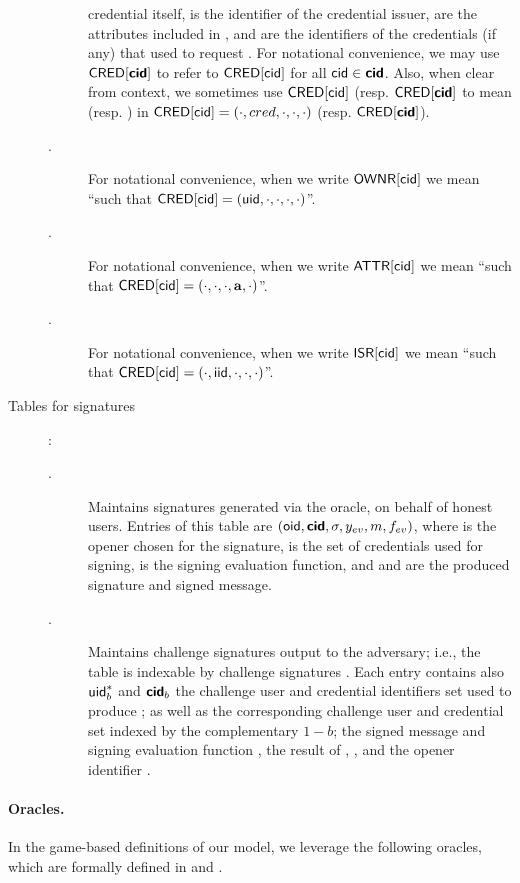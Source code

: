 \begin{description}
\begin{description}
    credential itself, \iid is the identifier of the credential issuer, \attrs
    are the attributes included in \cred, and \scid are the identifiers of the
    credentials (if any) that \uid used to request \cred. For notational
    convenience, we may use $\mathsf{CRED}[\boldsymbol{\mathsf{cid}}]$ to refer to $\mathsf{CRED}[\mathsf{cid}]$ for all
    $\mathsf{cid} \in \boldsymbol{\mathsf{cid}}$. Also, when clear from context, we sometimes use
    $\mathsf{CRED}[\mathsf{cid}]$ (resp. $\mathsf{CRED}[\boldsymbol{\mathsf{cid}}]$ to mean \cred (resp. \scred) in
    $\mathsf{CRED}[\mathsf{cid}] = (\cdot,cred,\cdot,\cdot,\cdot)$ (resp. $\mathsf{CRED}[\boldsymbol{\mathsf{cid}}]$).
  \item[\OWNR.] For notational convenience, when we write $\mathsf{OWNR}[\mathsf{cid}]$ we mean
    ``\uid such that $\mathsf{CRED}[\mathsf{cid}] = (\mathsf{uid}, \cdot, \cdot, \cdot, \cdot)$''.
  \item[\ATTR.] For notational convenience, when we write $\mathsf{ATTR}[\mathsf{cid}]$ we mean
    ``\attrs such that $\mathsf{CRED}[\mathsf{cid}] = (\cdot, \cdot, \cdot, \mathbf{a}, \cdot)$''.
  \item[\ISR.] For notational convenience, when we write $\mathsf{ISR}[\mathsf{cid}]$ we mean
    ``\iid such that $\mathsf{CRED}[\mathsf{cid}] = (\cdot, \mathsf{iid}, \cdot, \cdot, \cdot)$''.
  \end{description}
\item[Tables for signatures]:
  \begin{description}
  \item[\SIG.] Maintains signatures generated via the \SIGN oracle, on behalf
    of honest users. Entries of this table are $(\mathsf{oid},\boldsymbol{\mathsf{cid}},\sigma,y_{ev},m,
    f_{ev})$, where \oid is the opener chosen for the signature, \scid is the
    set of credentials used for signing, \feval is the signing evaluation
    function, and \sig and \msg are the produced signature and signed message.
  \item[\CSIG.] Maintains challenge signatures output to the adversary; i.e.,
    the table is indexable by challenge signatures \csig.
    Each entry contains also $\mathsf{uid}^*_b$ and $\boldsymbol{\mathsf{cid}}_b$ the challenge user and
    credential identifiers set used to produce \csig; as well as the
    corresponding challenge user and credential set indexed by the complementary
    $1-b$; the signed message \msg and signing evaluation function \feval, the
    result of \feval, \yeval, and the opener identifier \oid.
  \end{description}
\end{description}

\paragraph{Oracles.} %
In the game-based definitions of our \UAS model, we leverage the following
oracles, which are formally defined in  and
. 

